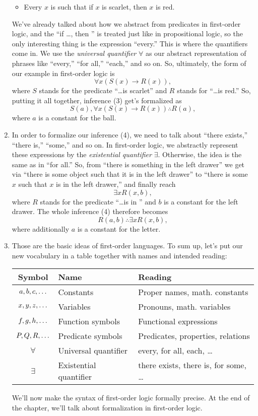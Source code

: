 \begin{enumerate}[\thesection.1]
\begin{itemize}
		\item Every $x$ is such that if $x$ is scarlet, then $x$ is red.
	
	\end{itemize}
We've already talked about how we abstract from predicates in first-order logic, and the ``if \dots, then \underline{\phantom{\dots}}'' is treated just like in propositional logic, so the only interesting thing is the expression ``every.'' This is where the quantifiers come in. We use the \emph{universal quantifier} $\forall$ as our abstract representation of phrases like ``every,'' ``for all,'' ``each,'' and so on. So, ultimately, the form of our example in first-order logic is \[\forall x(S(x)\to R(x)),\] where $S$ stands for the predicate ``\dots is scarlet'' and $R$ stands for ``\dots is red.'' So, putting it all together, inference (3) get's formalized as \[S(a), \forall x(S(x)\to R(x))\therefore R(a),\] where $a$ is a constant for the ball. 

	\item In order to formalize our inference (4), we need to talk about ``there exists,'' ``there is,'' ``some,'' and so on. In first-order logic, we abstractly represent these expressions by the \emph{existential quantifier} $\exists$. Otherwise, the idea is the same as in ``for all.'' So, from ``there is something in the left drawer'' we get via ``there is some object such that it is in the left drawer'' to ``there is some $x$ such that $x$ is in the left drawer,'' and finally reach \[\exists xR(x,b),\] where $R$ stands for the predicate ``\dots is in \underline{\phantom{\dots}}'' and $b$ is a constant for the left drawer. The whole inference (4) therefore becomes \[R(a,b)\therefore\exists xR(x,b),\] where additionally $a$ is a constant for the letter.

	\item Those are the basic ideas of first-order languages. To sum up, let's put our new vocabulary in a table together with names and intended reading:
	\begin{longtable}{c | l | l}
	Symbol & Name & Reading\\\hline
	$a,b,c,\mathellipsis$ & Constants & Proper names, math. constants\\
	$x,y,z,\mathellipsis$ & Variables & Pronouns, math. variables\\
	$f,g,h, \mathellipsis$ & Function symbols & Functional expressions\\
	$P,Q,R,\mathellipsis$ & Predicate symbols & Predicates, properties, relations\\
	$\forall $ & Universal quantifier & every, for all, each, \dots\\
	$\exists$ & Existential quantifier & there exists, there is, for some, \dots
	\end{longtable}
	
	We'll now make the syntax of first-order logic formally precise. At the end of the chapter, we'll talk about formalization in first-order logic.
		
	\end{enumerate}
	
